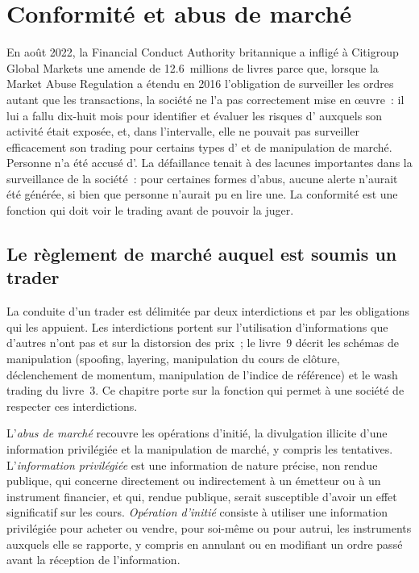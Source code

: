 \chapter{Conformité et abus de marché}\label{ch:fm:compliance-and-market-abuse}

En août 2022, la Financial Conduct Authority britannique a infligé à Citigroup Global Markets une amende de 12.6~millions de livres parce que, lorsque la Market Abuse Regulation
a étendu en 2016 l'obligation de surveiller les ordres autant que les transactions, la société ne l'a pas correctement mise en œuvre~: il lui a fallu dix-huit mois pour identifier et
évaluer les risques d' auxquels son activité était exposée, et, dans l'intervalle, elle ne pouvait pas surveiller efficacement son trading pour certains types
d' et de manipulation de marché. Personne n'a été accusé d'. La défaillance tenait à des lacunes importantes dans la surveillance de la société~: pour certaines formes
d'abus, aucune alerte n'aurait été générée, si bien que personne n'aurait pu en lire une. La conformité est une fonction qui doit voir le trading avant de pouvoir
la juger.

\section{Le règlement de marché auquel est soumis un trader}

La conduite d'un trader est délimitée par deux interdictions et par les obligations qui les appuient. Les interdictions portent sur l'utilisation d'informations que d'autres n'ont pas
et sur la distorsion des prix~; le livre~9 décrit les schémas de manipulation (spoofing, layering, manipulation du cours de clôture, déclenchement de momentum, manipulation de
l'indice de référence) et le wash trading du livre~3. Ce chapitre porte sur la fonction qui permet à une société de respecter ces interdictions.

\begin{definition}\label{def:fm:compliance-and-market-abuse:abuse}
L'\emph{abus de marché} recouvre les opérations d'initié, la divulgation illicite d'une information privilégiée et la manipulation de marché, y compris
les tentatives. L'\emph{information privilégiée} est une information de nature précise, non rendue publique, qui concerne directement ou indirectement
à un émetteur ou à un instrument financier, et qui, rendue publique, serait susceptible d'avoir un effet significatif sur les cours. \emph{Opération
d'initié} consiste à utiliser une information privilégiée pour acheter ou vendre, pour soi-même ou pour autrui, les instruments auxquels elle se rapporte, y compris
en annulant ou en modifiant un ordre passé avant la réception de l'information.
\end{definition}

